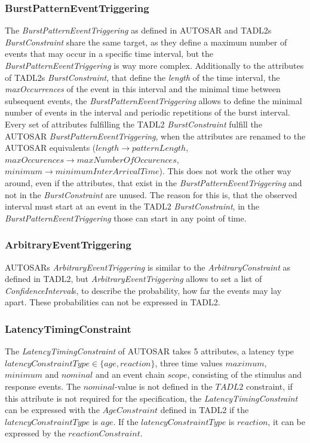 	\subsubsection{BurstPatternEventTriggering}
		The \emph{BurstPatternEventTriggering} as defined in AUTOSAR and TADL2s \emph{BurstConstraint} share the same target, as they define a maximum number of events that may occur in a specific time interval, but the \emph{BurstPatternEventTriggering} is way more complex. Additionally to the attributes of TADL2s \emph{BurstConstraint}, that define the \emph{length} of the time interval, the \emph{maxOccurrences} of the event in this interval and the minimal time between subsequent events, the \emph{BurstPatternEventTriggering} allows to define the minimal number of events in the interval and periodic repetitions of the burst interval.\\
		Every set of attributes fulfilling the TADL2 \emph{BurstConstraint} fulfill the AUTOSAR \emph{BurstPatternEventTriggering}, when the attributes are renamed to the AUTOSAR equivalents ($length\rightarrow patternLength$, $maxOccurences\rightarrow maxNumberOfOccurences$, $minimum\rightarrow minimumInterArrivalTime$). This does not work the other way around, even if the attributes, that exist in the \emph{BurstPatternEventTriggering} and not in the \emph{BurstConstraint} are unused. The reason for this is, that the observed interval must start at an event in the TADL2 \emph{BurstConstraint}, in the \emph{BurstPatternEventTriggering} those can start in any point of time.
		
	\subsubsection{ArbitraryEventTriggering}
		AUTOSARs \emph{ArbitraryEventTriggering} is similar to the \emph{ArbitraryConstraint} as defined in TADL2, but \emph{ArbitraryEventTriggering} allows to set a list of \emph{ConfidenceInterval}s, to describe the probability, how far the events may lay apart. These probabilities can not be expressed in TADL2.
		
	\subsubsection{LatencyTimingConstraint}
		The \emph{LatencyTimingConstraint} of AUTOSAR takes 5 attributes, a latency type $latencyConstraintType\in \{age, reaction\}$, three time values $maximum$, $minimum$ and $nominal$ and an event chain $scope$, consisting of the stimulus and response events. The $nominal$-value is not defined in the $TADL2$ constraint, if this attribute is not required for the specification, the \emph{LatencyTimingConstraint} can be expressed with the $AgeConstraint$ defined in TADL2 if the $latencyConstraintType$ is $age$. If  the $latencyConstraintType$ is $reaction$, it can be expressed by the $reactionConstraint$.
	

